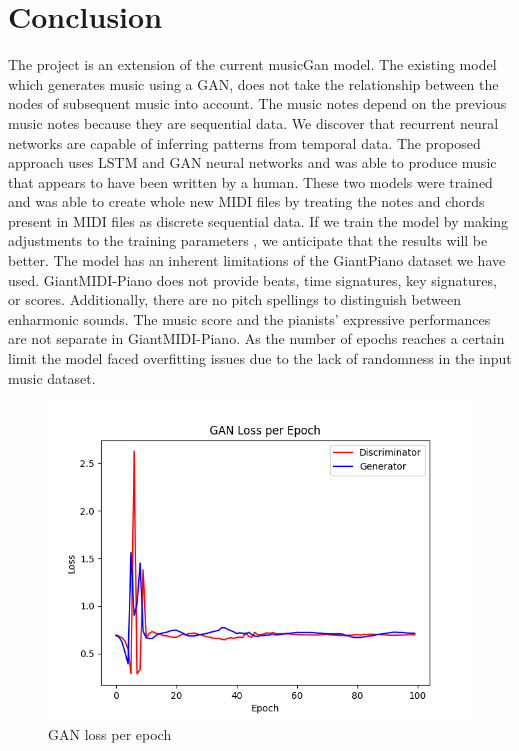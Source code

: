\documentclass[letterpaper]{article}
\begin{document}
\section{Conclusion}
The project is an extension of the current musicGan model. The existing model which generates music using a GAN, does not take the relationship between the nodes of subsequent music into account. The music notes depend on the previous music notes because they are sequential data. We discover that recurrent neural networks are capable of inferring patterns from temporal data. The proposed approach uses LSTM and GAN neural networks  and was able to produce music that appears to have been written by a human. These two models were trained and was able to create whole new MIDI files by treating the notes and chords present in MIDI files as discrete sequential data. If we train the model by making adjustments to the training parameters , we anticipate that the results will be better. 
The model has an inherent limitations of the GiantPiano dataset we have used.  GiantMIDI-Piano does not provide beats, time signatures, key signatures, or scores. Additionally, there are no pitch spellings to distinguish between enharmonic sounds. The music score and the pianists' expressive performances are not separate in GiantMIDI-Piano. As the number of epochs reaches a certain limit the model faced overfitting issues due to the lack of randomness in the input music dataset. 

\begin{figure}
\centerline{\includegraphics[scale=.4]{GAN_Loss_per_Epoch_final .png}}
\caption{GAN loss per epoch}
\label{fig}
\end{figure}
\end{document}
